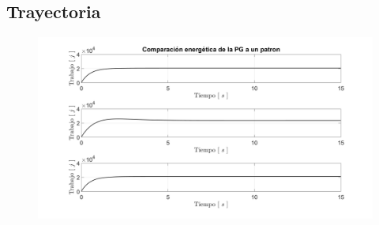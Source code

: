 \documentclass{beamer}
\begin{document}
\subsection{Trayectoria}
\begin{frame}
 \begin{figure}
  \centering
  \includegraphics[width=\textwidth]{../03_Reporte/img/energiamovsubplot.png}
 \end{figure}

\end{frame}
\end{document}
